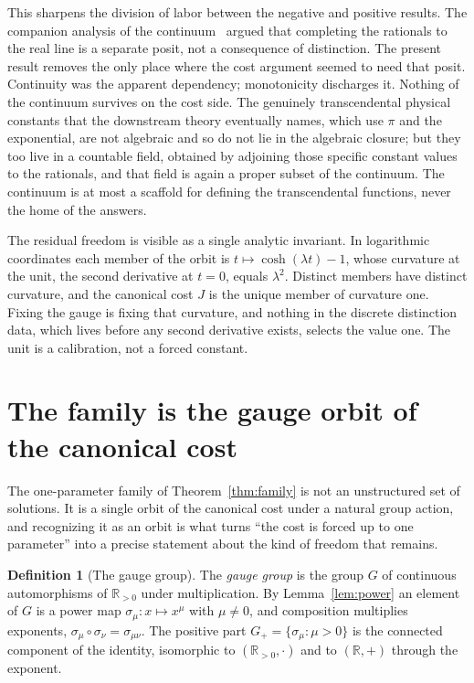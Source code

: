 \documentclass[11pt,a4paper]{article}
\theoremstyle{definition}
\newtheorem{definition}[theorem]{Definition}
\theoremstyle{remark}
\newcommand{\Rpos}{\mathbb{R}_{>0}}
\begin{document}
This sharpens the division of labor between the negative and positive results. The
companion analysis of the continuum~\cite{WashburnContinuum2026} argued that
completing the rationals to the real line is a separate posit, not a consequence
of distinction. The present result removes the only place where the cost argument
seemed to need that posit. Continuity was the apparent dependency; monotonicity
discharges it. Nothing of the continuum survives on the cost side. The genuinely
transcendental physical constants that the downstream theory eventually names,
which use $\pi$ and the exponential, are not algebraic and so do not lie in the
algebraic closure; but they too live in a countable field, obtained by adjoining
those specific constant values to the rationals, and that field is again a proper
subset of the continuum. The continuum is at most a scaffold for defining the
transcendental functions, never the home of the answers.

The residual freedom is visible as a single analytic invariant. In logarithmic
coordinates each member of the orbit is $t \mapsto \cosh(\lambda t) - 1$, whose
curvature at the unit, the second derivative at $t = 0$, equals $\lambda^{2}$.
Distinct members have distinct curvature, and the canonical cost $J$ is the unique
member of curvature one. Fixing the gauge is fixing that curvature, and nothing in
the discrete distinction data, which lives before any second derivative exists,
selects the value one. The unit is a calibration, not a forced constant.

\section{The family is the gauge orbit of the canonical cost}\label{sec:gauge}

The one-parameter family of Theorem~\ref{thm:family} is not an unstructured set
of solutions. It is a single orbit of the canonical cost under a natural group
action, and recognizing it as an orbit is what turns ``the cost is forced up to
one parameter'' into a precise statement about the kind of freedom that remains.

\begin{definition}[The gauge group]\label{def:gauge}
The \emph{gauge group} is the group $G$ of continuous automorphisms of $\Rpos$
under multiplication. By Lemma~\ref{lem:power} an element of $G$ is a power map
$\sigma_{\mu} \colon x \mapsto x^{\mu}$ with $\mu \neq 0$, and composition
multiplies exponents, $\sigma_{\mu} \circ \sigma_{\nu} = \sigma_{\mu\nu}$. The
positive part $G_{+} = \{\sigma_{\mu} : \mu > 0\}$ is the connected component of
the identity, isomorphic to $(\Rpos, \cdot)$ and to $(\mathbb{R}, +)$ through the
exponent.
\end{definition}
\end{document}
